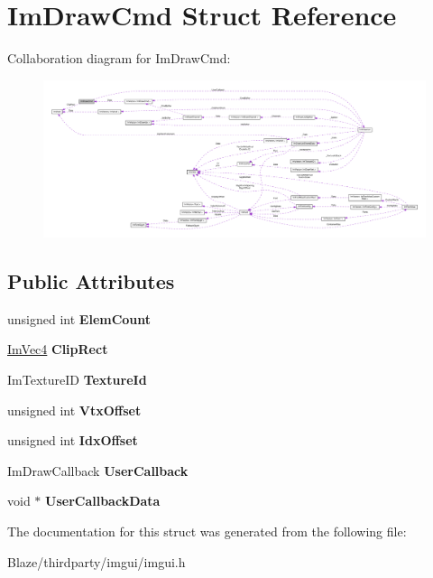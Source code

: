 \hypertarget{structImDrawCmd}{}\section{Im\+Draw\+Cmd Struct Reference}
\label{structImDrawCmd}


Collaboration diagram for Im\+Draw\+Cmd\+:\nopagebreak
\begin{figure}[H]
\begin{center}
\leavevmode
\includegraphics[width=350pt]{structImDrawCmd__coll__graph}
\end{center}
\end{figure}
\subsection*{Public Attributes}
\begin{DoxyCompactItemize}
\item 
\mbox{\label{structImDrawCmd_aafe2532964fb1f6905d67d84dd3e8730}} 
unsigned int {\bfseries Elem\+Count}
\item 
\mbox{\label{structImDrawCmd_a838918f420ff81cb8dc7265077592daa}} 
\hyperlink{structImVec4}{Im\+Vec4} {\bfseries Clip\+Rect}
\item 
\mbox{\label{structImDrawCmd_a4f3b5985ece9ca6b71e7a8e7d85a82e5}} 
Im\+Texture\+ID {\bfseries Texture\+Id}
\item 
\mbox{\label{structImDrawCmd_a604086d3c94a18b3a79f171ee37edabb}} 
unsigned int {\bfseries Vtx\+Offset}
\item 
\mbox{\label{structImDrawCmd_adec5adcd0cc6cf0da193bf0437fbba47}} 
unsigned int {\bfseries Idx\+Offset}
\item 
\mbox{\label{structImDrawCmd_ad26dac4e939f5c4bb892cbca0f9e3af8}} 
Im\+Draw\+Callback {\bfseries User\+Callback}
\item 
\mbox{\label{structImDrawCmd_ae2f5a0baf4a0b25942237b8ce6adb42d}} 
void $\ast$ {\bfseries User\+Callback\+Data}
\end{DoxyCompactItemize}


The documentation for this struct was generated from the following file\+:\begin{DoxyCompactItemize}
\item 
Blaze/thirdparty/imgui/imgui.\+h\end{DoxyCompactItemize}
